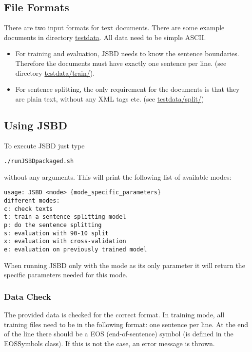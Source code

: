 \documentclass[11pt,a4paper,halfparskip]{scrartcl}
\begin{document}
\subsection{File Formats}
\label{sec_formats}
There are two input formats for text documents. There are some example
documents in directory \url{testdata}. All data need to be simple
ASCII.
\begin{itemize}
\item For training and evaluation, JSBD needs to know the sentence
  boundaries.  Therefore the documents must have exactly one sentence
  per line. (see directory \url{testdata/train/}).
\item For sentence splitting, the only requirement for the documents
  is that they are plain text, without any XML tags etc. (see
  \url{testdata/split/})
\end{itemize}


\subsection{Using JSBD}

To execute JSBD just type 

\begin{verbatim}
./runJSBDpackaged.sh
\end{verbatim}

without any arguments. This will print the following list of available
modes:

\begin{verbatim}
usage: JSBD <mode> {mode_specific_parameters}
different modes:
c: check texts
t: train a sentence splitting model
p: do the sentence splitting
s: evaluation with 90-10 split
x: evaluation with cross-validation
e: evaluation on previously trained model
\end{verbatim}

When running JSBD only with the mode as its only parameter it will
return the specific parameters needed for this mode.

\subsubsection{Data Check}

The provided data is checked for the correct format. In training mode,
all training files need to be in the following format: one sentence
per line. At the end of the line there should be a EOS
(end-of-sentence) symbol (is defined in the EOSSymbols class). If this
is not the case, an error message is thrown.
\end{document}
